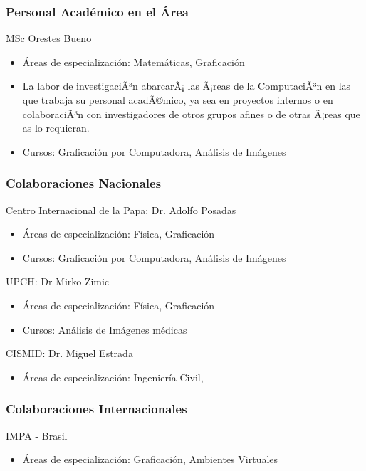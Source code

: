 \subsubsection{Personal Acad\'emico en el \'Area}

MSc Orestes Bueno
\begin{itemize}
\item \'Areas de especializaci\'on: Matem\'aticas, Graficaci\'on \item La labor de investigaciÃ³n abarcarÃ¡ las Ã¡reas de la ComputaciÃ³n en las que trabaja su personal acadÃ©mico, ya sea en proyectos internos o en colaboraciÃ³n con investigadores de otros grupos afines o de otras Ã¡reas que as  lo requieran.

\item Cursos: Graficaci\'on por Computadora, An\'alisis de Im\'agenes
\end{itemize}

\subsubsection{Colaboraciones Nacionales}

Centro Internacional de la Papa: Dr. Adolfo Posadas
\begin{itemize}
\item \'Areas de especializaci\'on: F\'isica, Graficaci\'on 
\item Cursos: Graficaci\'on por Computadora, An\'alisis de Im\'agenes
\end{itemize}

UPCH: Dr Mirko Zimic
\begin{itemize}
\item \'Areas de especializaci\'on: F\'isica, Graficaci\'on 
\item Cursos: An\'alisis de Im\'agenes m\'edicas
\end{itemize}

CISMID: Dr. Miguel Estrada
\begin{itemize}
\item \'Areas de especializaci\'on: Ingenier\'ia Civil, 
\end{itemize}

\subsubsection{Colaboraciones Internacionales}

IMPA - Brasil
\begin{itemize}
\item \'Areas de especializaci\'on: Graficaci\'on, Ambientes Virtuales
\end{itemize}


